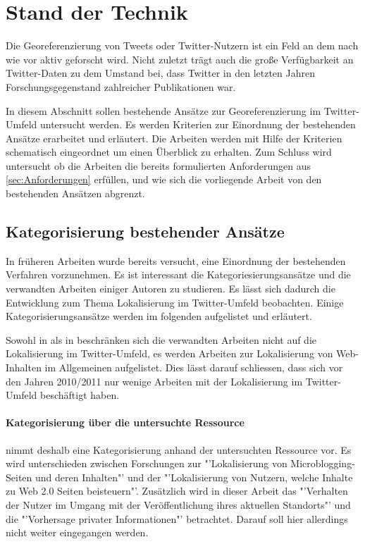 		

			
\chapter{Stand der Technik} 
	Die Georeferenzierung von Tweets oder Twitter-Nutzern ist ein Feld an dem nach wie vor aktiv geforscht wird.
	Nicht zuletzt trägt auch die große Verfügbarkeit an Twitter-Daten zu dem Umstand bei, dass Twitter in den letzten Jahren Forschungsgegenstand zahlreicher Publikationen war. 
	
	In diesem Abschnitt sollen bestehende Ansätze zur Georeferenzierung im Twitter-Umfeld untersucht werden. 
	Es werden Kriterien zur Einordnung der bestehenden Ansätze erarbeitet und erläutert.   
	Die Arbeiten werden mit Hilfe der Kriterien schematisch eingeordnet um einen Überblick zu erhalten. 
	Zum Schluss wird untersucht ob die Arbeiten die bereits formulierten Anforderungen aus \ref{sec:Anforderungen} erfüllen, und wie sich die vorliegende Arbeit von den bestehenden Ansätzen abgrenzt.    

		\section{Kategorisierung bestehender Ansätze}

		In früheren Arbeiten wurde bereits versucht, eine Einordnung der bestehenden Verfahren vorzunehmen. 
		Es ist interessant die Kategoriesierungsansätze und die verwandten Arbeiten einiger Autoren zu studieren.
		Es lässt sich dadurch die Entwicklung zum Thema Lokalisierung im Twitter-Umfeld beobachten. 
		Einige Kategorisierungsansätze werden im folgenden aufgelistet und erläutert.

		Sowohl in \cite{Hecht2011} als in \cite{Cheng2010} beschränken sich die verwandten Arbeiten nicht auf die Lokalisierung im Twitter-Umfeld, es werden Arbeiten zur Lokalisierung von Web-Inhalten im Allgemeinen aufgelistet. 
		Dies lässt darauf schliessen, dass sich vor den Jahren 2010/2011 nur wenige Arbeiten mit der Lokalisierung im Twitter-Umfeld beschäftigt haben.  
		
		\subsubsection{Kategorisierung über die untersuchte Ressource}
		\cite{Hecht2011} nimmt deshalb eine Kategorisierung anhand der untersuchten Ressource vor. 
		Es wird unterschieden zwischen Forschungen zur "'Lokalisierung von Microblogging-Seiten und deren Inhalten"' und der "'Lokalisierung von Nutzern, welche Inhalte zu Web 2.0 Seiten beisteuern"'. 
		Zusätzlich wird in dieser Arbeit das "'Verhalten der Nutzer im Umgang mit der Veröffentlichung ihres aktuellen Standorts"' und die "'Vorhersage privater Informationen"' betrachtet. Darauf soll hier allerdings nicht weiter eingegangen werden.      

